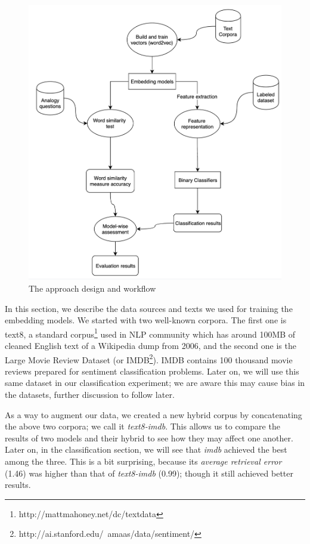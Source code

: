 \documentclass[11pt,letterpaper]{article}
\begin{document}
\begin{figure}
\centering
\includegraphics{img/w2v_eval_workflow.png}
\caption{The approach design and workflow\label{fig:workflow}}
\end{figure}



In this section, we describe the data sources and texts we used for
training the embedding models. We started with two well-known corpora.
The first one is text8, a standard
corpus\footnote{http://mattmahoney.net/dc/textdata} used in NLP
community which has around 100MB of cleaned English text of a Wikipedia
dump from 2006, and the second one is the Large Movie Review Dataset (or
IMDB\footnote{http://ai.stanford.edu/~amaas/data/sentiment/}). IMDB
contains 100 thousand movie reviews prepared for sentiment
classification problems. Later on, we will use this same dataset in our
classification experiment; we are aware this may cause bias in the
datasets, further discussion to follow later.

As a way to augment our data, we created a new hybrid corpus by
concatenating the above two corpora; we call it \emph{text8-imdb}. This
allows us to compare the results of two models and their hybrid to see
how they may affect one another. Later on, in the classification
section, we will see that \emph{imdb} achieved the best among the three.
This is a bit surprising, because its \emph{average retrieval error}
(1.46) was higher than that of \emph{text8-imdb} (0.99); though it still
achieved better results.
\end{document}
